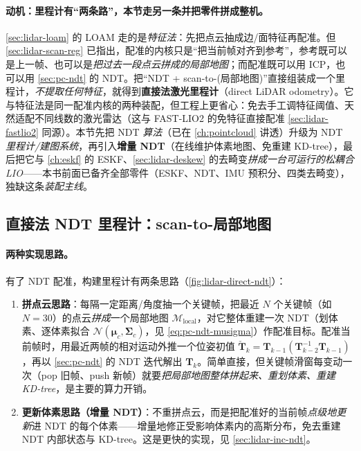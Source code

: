 \paragraph{动机：里程计有“两条路”，本节走另一条并把零件拼成整机。}
\cref{sec:lidar-loam} 的 LOAM 走的是\emph{特征法}：先把点云抽成边/面特征再配准。但 \cref{sec:lidar-scan-reg} 已指出，配准的内核只是“把当前帧对齐到参考”，参考既可以是上一帧、也可以是\emph{把过去一段点云拼成的局部地图}；而配准既可以用 ICP，也可以用 \cref{sec:pc-ndt} 的 NDT。把“NDT + scan-to-(局部地图)”直接组装成一个里程计，\emph{不提取任何特征}，就得到\textbf{直接法激光里程计}（direct LiDAR odometry）\cite{gao2023slamad}。它与特征法是同一配准内核的两种装配，但工程上更省心：免去手工调特征阈值、天然适配不同线数的激光雷达（这与 FAST-LIO2 的免特征直接配准 \cref{sec:lidar-fastlio2} 同源）。本节先把 NDT \emph{算法}（已在 \cref{ch:pointcloud} 讲透）升级为 NDT \emph{里程计/建图系统}，再引入\textbf{增量 NDT}（在线维护体素地图、免重建 KD-tree），最后把它与 \cref{ch:eskf} 的 ESKF、\cref{sec:lidar-deskew} 的去畸变\emph{拼成一台可运行的松耦合 LIO}——本书前面已备齐全部零件（ESKF、NDT、IMU 预积分、四类去畸变），独缺这条\emph{装配主线}。

\subsection{直接法 NDT 里程计：scan-to-局部地图}
\label{sec:lidar-direct-ndt}

\paragraph{两种实现思路。}
有了 NDT 配准，构建里程计有两条思路\cite{gao2023slamad}（\cref{fig:lidar-direct-ndt}）：
\begin{enumerate}
  \item \textbf{拼点云思路}：每隔一定距离/角度抽一个关键帧，把最近 $N$ 个关键帧（如 $N{=}30$）的点云\emph{拼成}一个局部地图 $\mathcal{M}_{\text{local}}$，对它整体重建一次 NDT（划体素、逐体素拟合 $\mathcal N(\boldsymbol\mu_c,\boldsymbol\Sigma_c)$，见 \cref{eq:pc-ndt-musigma}）作配准目标。配准当前帧时，用最近两帧的相对运动外推一个位姿初值 $\check{\mathbf{T}}_k=\mathbf{T}_{k-1}(\mathbf{T}_{k-2}^{-1}\mathbf{T}_{k-1})$，再以 \cref{sec:pc-ndt} 的 NDT 迭代解出 $\mathbf{T}_k$。简单直接，但关键帧滑窗每变动一次（pop 旧帧、push 新帧）就要\emph{把局部地图整体拼起来、重划体素、重建 KD-tree}，是主要的算力开销。
  \item \textbf{更新体素思路（增量 NDT）}：不重拼点云，而是把配准好的当前帧\emph{点级地更新}进 NDT 的每个体素——增量地修正受影响体素内的高斯分布，免去重建 NDT 内部状态与 KD-tree。这是更快的实现，见 \cref{sec:lidar-inc-ndt}。
\end{enumerate}


